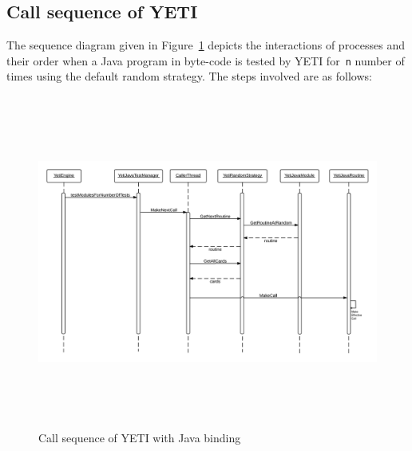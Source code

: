 \subsection{Call sequence of YETI}
The sequence diagram given in Figure~\ref{fig:yetiSequenceDiagram} depicts the interactions of processes and their order when a Java program in byte-code is tested by YETI for~\verb+n+ number of times using the default random strategy.  The steps involved are as follows:

\bigskip
\begin{figure}[H]
	\centering
	\includegraphics[width=15.5cm, height=11cm]{chapter3/sequenceDiagram.png}
	\bigskip
	\caption{Call sequence of YETI with Java binding}
	\label{fig:yetiSequenceDiagram}
\end{figure}
\bigskip

